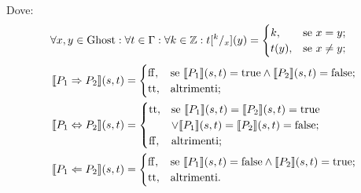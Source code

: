 Dove:
\begin{align*}
   \forall x,y\in\mathrm{Ghost}\mathrel{:}\forall t \in\Gamma\mathrel{:}\forall k\in\mathbb{Z} \mathrel{:} t[^k/_x]( y)
      &=
        \begin{cases}
                 k,   &\text{se $x = y$};\\
                 t(y),&\text{se $x  \neq  y$};
        \end{cases}
\end{align*}
\begin{align*}
    \llbracket P_1 \Rightarrow P_2\rrbracket(s,t)
       &=
        \begin{cases}
            \mathrm{ff}, &\text{se $\llbracket P_1\rrbracket(s,t) = \mathrm{true} \land \llbracket P_2\rrbracket(s,t) = \mathrm{false}$};\\
            \mathrm{tt}, &\text{altrimenti};
        \end{cases}\\
    \llbracket P_1 \Leftrightarrow P_2\rrbracket(s,t)
       &=
        \begin{cases}
            \mathrm{tt},&\text{se $\llbracket P_1\rrbracket(s,t) = \llbracket P_2\rrbracket(s,t) = \mathrm{true}$}\\
                 &\text{$\lor\llbracket P_1\rrbracket(s,t) = \llbracket P_2 \rrbracket(s,t) = \mathrm{false}$};  \\
           \mathrm{ff}, &\text{altrimenti};
        \end{cases} \\
   \llbracket P_1 \Leftarrow P_2\rrbracket(s,t)
      &=
        \begin{cases}
            \mathrm{ff},&\text{se $\llbracket P_1\rrbracket(s,t) = \mathrm{false} \land \llbracket P_2\rrbracket(s,t) = \mathrm{true}$};\\
            \mathrm{tt},&\text{altrimenti}.
   \end{cases}
\end{align*}
